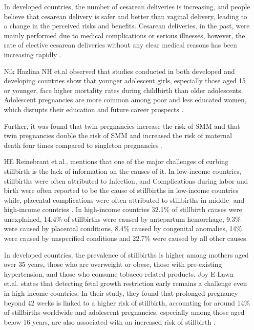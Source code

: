 In developed countries, the number of cesarean deliveries is increasing, and people believe that cesarean delivery is safer and better than vaginal delivery, leading to a change in the perceived risks and benefits. Cesarean deliveries, in the past, were mainly performed due to medical complications or serious illnesses, however, the rate of elective cesarean deliveries without any clear medical reasons has been increasing rapidly \cite{sauve_kramer_2007}.

Nik Hazlina NH et.al observed that studies conducted in both developed and developing countries show that younger adolescent girls, especially those aged 15 or younger, face higher mortality rates during childbirth than older adolescents. Adolescent pregnancies are more common among poor and less educated women, which disrupts their education and future career prospects \cite{nikkamil_2022}.

Further, it was found that twin pregnancies increase the risk of SMM and that twin pregnancies double the risk of SMM and increased the risk of maternal death four times compared to singleton pregnancies \cite{nikkamil_2022}.

HE Reinebrant et.al., mentions that one of the major challenges of curbing stillbirth is the lack of information on the causes of it. In low-income countries, stillbirths were often attributed to Infection, and Complications during labor and birth were often reported to be the cause of stillbirths in low-income countries while, placental complications were often attributed to stillbirths in middle- and high-income countries  \cite{reinebrant}. In high-income countries 32.1\% of stillbirth causes were unexplained, 14.4\% of stillbirths were caused by antepartum hemorrhage, 9.3\% were caused by placental conditions, 8.4\% caused by congenital anomalies, 14\% were caused by unspecified conditions and 22.7\% were caused by all other causes.

In developed countries, the prevalence of stillbirths is higher among mothers aged over 35 years, those who are overweight or obese, those with pre-existing hypertension, and those who consume tobacco-related products. Joy E Lawn et.al. states that detecting fetal growth restriction early remains a challenge even in high-income countries. In their study, they found that prolonged pregnancy beyond 42 weeks is linked to a higher risk of stillbirth, accounting for around 14\% of stillbirths worldwide and adolescent pregnancies, especially among those aged below 16 years, are also associated with an increased risk of stillbirth \cite{lawn_blencowe_2016}. 

